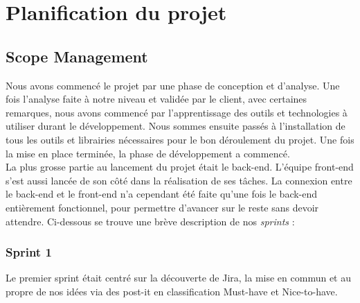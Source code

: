 \documentclass[t, 12pt, usenames,dvipsnames]{article}
\begin{document}
    \newpage
    
    \section{Planification du projet}
        \subsection{Scope Management}
        \noindent Nous avons commencé le projet par une phase de conception et d'analyse. Une fois l'analyse faite à notre niveau et validée par le client, avec certaines remarques, nous avons commencé par l'apprentissage des outils et technologies à utiliser durant le développement. Nous sommes ensuite passés à l'installation de tous les outils et librairies nécessaires pour le bon déroulement du projet. Une fois la mise en place terminée, la phase de développement a commencé.\\
        La plus grosse partie au lancement du projet était le back-end. L'équipe front-end s'est aussi lancée de son côté dans la réalisation de ses tâches. La connexion entre le back-end et le front-end n'a cependant été faite qu'une fois le back-end entièrement fonctionnel, pour permettre d'avancer sur le reste sans devoir attendre.
        Ci-dessous se trouve une brève description de nos \textit{sprints} : 

            \subsubsection{Sprint 1}
                \noindent Le premier sprint était centré sur la découverte de  Jira, la mise en commun et au propre de nos idées via des post-it en classification Must-have et Nice-to-have. 
                
\end{document}
